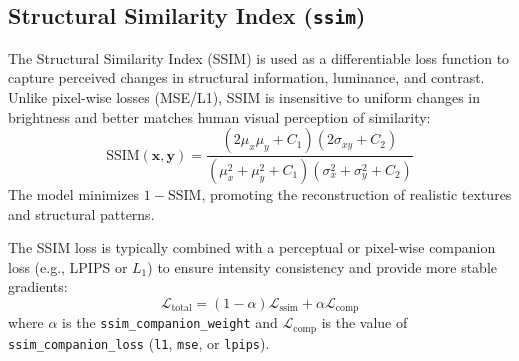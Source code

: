 \documentclass[11pt]{article}
\begin{document}
\subsection{Structural Similarity Index (\texttt{ssim})}
The Structural Similarity Index (SSIM) is used as a differentiable loss function to capture perceived changes in structural information, luminance, and contrast. Unlike pixel-wise losses (MSE/L1), SSIM is insensitive to uniform changes in brightness and better matches human visual perception of similarity:
\[
    \text{SSIM}(\mathbf{x}, \mathbf{y}) = \frac{(2\mu_x\mu_y + C_1)(2\sigma_{xy} + C_2)}{(\mu_x^2 + \mu_y^2 + C_1)(\sigma_x^2 + \sigma_y^2 + C_2)}
\]
The model minimizes $1 - \text{SSIM}$, promoting the reconstruction of realistic textures and structural patterns. 

The SSIM loss is typically combined with a perceptual or pixel-wise companion loss (e.g., LPIPS or $L_1$) to ensure intensity consistency and provide more stable gradients:
\[
    \mathcal{L}_{\text{total}} = (1 - \alpha)\mathcal{L}_{\text{ssim}} + \alpha\mathcal{L}_{\text{comp}}
\]
where $\alpha$ is the \texttt{ssim\_companion\_weight} and $\mathcal{L}_{\text{comp}}$ is the value of \texttt{ssim\_companion\_loss} (\texttt{l1}, \texttt{mse}, or \texttt{lpips}).
\end{document}
